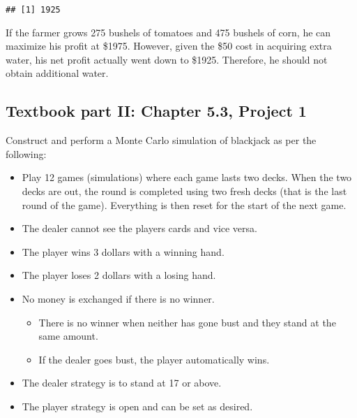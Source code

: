 \documentclass[]{article}
\providecommand{\tightlist}{%
  \setlength{\itemsep}{0pt}\setlength{\parskip}{0pt}}
\begin{document}
\begin{verbatim}
## [1] 1925
\end{verbatim}

If the farmer grows 275 bushels of tomatoes and 475 bushels of corn, he
can maximize his profit at \$1975. However, given the \$50 cost in
acquiring extra water, his net profit actually went down to \$1925.
Therefore, he should not obtain additional water.

\newpage

\subsection{Textbook part II: Chapter 5.3, Project
1}\label{textbook-part-ii-chapter-5.3-project-1}

Construct and perform a Monte Carlo simulation of blackjack as per the
following:

\begin{itemize}
\tightlist
\item
  Play 12 games (simulations) where each game lasts two decks. When the
  two decks are out, the round is completed using two fresh decks (that
  is the last round of the game). Everything is then reset for the start
  of the next game.\\
\item
  The dealer cannot see the players cards and vice versa.\\
\item
  The player wins 3 dollars with a winning hand.\\
\item
  The player loses 2 dollars with a losing hand.\\
\item
  No money is exchanged if there is no winner.

  \begin{itemize}
  \tightlist
  \item
    There is no winner when neither has gone bust and they stand at the
    same amount.\\
  \item
    If the dealer goes bust, the player automatically wins.\\
  \end{itemize}
\item
  The dealer strategy is to stand at 17 or above.\\
\item
  The player strategy is open and can be set as desired.
\end{itemize}
\end{document}
